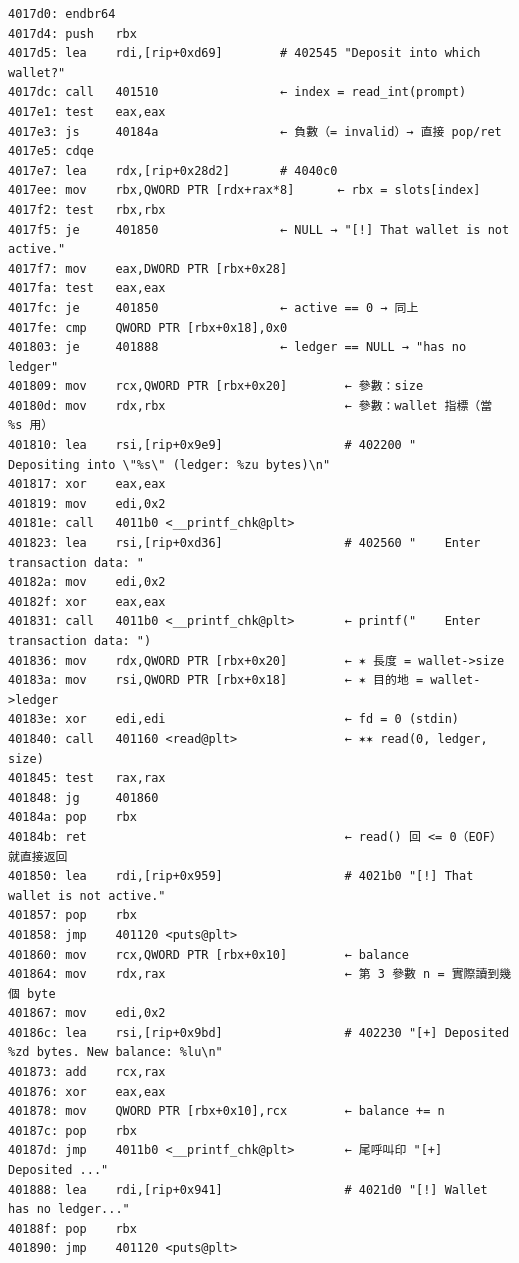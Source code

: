 \documentclass[10pt,a4paper]{article}
\begin{document}
\begin{Verbatim}[breaklines=true,breakanywhere=true,breakautoindent=false,fontsize=\fontsize{7.0}{9.5}\selectfont]
4017d0: endbr64
4017d4: push   rbx
4017d5: lea    rdi,[rip+0xd69]        # 402545 "Deposit into which wallet?"
4017dc: call   401510                 ← index = read_int(prompt)
4017e1: test   eax,eax
4017e3: js     40184a                 ← 負數（= invalid）→ 直接 pop/ret
4017e5: cdqe
4017e7: lea    rdx,[rip+0x28d2]       # 4040c0
4017ee: mov    rbx,QWORD PTR [rdx+rax*8]      ← rbx = slots[index]
4017f2: test   rbx,rbx
4017f5: je     401850                 ← NULL → "[!] That wallet is not active."
4017f7: mov    eax,DWORD PTR [rbx+0x28]
4017fa: test   eax,eax
4017fc: je     401850                 ← active == 0 → 同上
4017fe: cmp    QWORD PTR [rbx+0x18],0x0
401803: je     401888                 ← ledger == NULL → "has no ledger"
401809: mov    rcx,QWORD PTR [rbx+0x20]        ← 參數：size
40180d: mov    rdx,rbx                         ← 參數：wallet 指標（當 %s 用）
401810: lea    rsi,[rip+0x9e9]                 # 402200 "    Depositing into \"%s\" (ledger: %zu bytes)\n"
401817: xor    eax,eax
401819: mov    edi,0x2
40181e: call   4011b0 <__printf_chk@plt>
401823: lea    rsi,[rip+0xd36]                 # 402560 "    Enter transaction data: "
40182a: mov    edi,0x2
40182f: xor    eax,eax
401831: call   4011b0 <__printf_chk@plt>       ← printf("    Enter transaction data: ")
401836: mov    rdx,QWORD PTR [rbx+0x20]        ← ✶ 長度 = wallet->size
40183a: mov    rsi,QWORD PTR [rbx+0x18]        ← ✶ 目的地 = wallet->ledger
40183e: xor    edi,edi                         ← fd = 0 (stdin)
401840: call   401160 <read@plt>               ← ✶✶ read(0, ledger, size)
401845: test   rax,rax
401848: jg     401860
40184a: pop    rbx
40184b: ret                                    ← read() 回 <= 0（EOF）就直接返回
401850: lea    rdi,[rip+0x959]                 # 4021b0 "[!] That wallet is not active."
401857: pop    rbx
401858: jmp    401120 <puts@plt>
401860: mov    rcx,QWORD PTR [rbx+0x10]        ← balance
401864: mov    rdx,rax                         ← 第 3 參數 n = 實際讀到幾個 byte
401867: mov    edi,0x2
40186c: lea    rsi,[rip+0x9bd]                 # 402230 "[+] Deposited %zd bytes. New balance: %lu\n"
401873: add    rcx,rax
401876: xor    eax,eax
401878: mov    QWORD PTR [rbx+0x10],rcx        ← balance += n
40187c: pop    rbx
40187d: jmp    4011b0 <__printf_chk@plt>       ← 尾呼叫印 "[+] Deposited ..."
401888: lea    rdi,[rip+0x941]                 # 4021d0 "[!] Wallet has no ledger..."
40188f: pop    rbx
401890: jmp    401120 <puts@plt>
\end{Verbatim}
\end{document}
